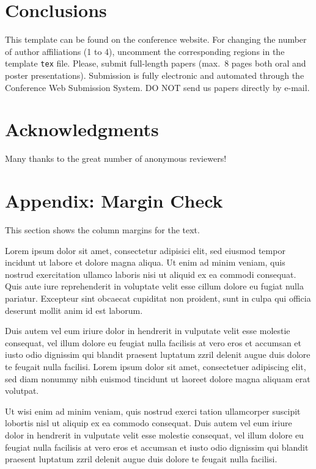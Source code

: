 \documentclass[twoside,a4paper]{article}
\begin{document}
\section{Conclusions}
This template can be found on the conference website.
For changing the number of author affiliations (1 to 4), uncomment the corresponding regions in the template \texttt{tex} file.
Please, submit full-length papers (max.~8 pages both oral and poster presentations).
Submission is fully electronic and automated through the Conference Web Submission System.
DO NOT send us papers directly by e-mail.

\section{Acknowledgments}
Many thanks to the great number of anonymous reviewers!

\nocite{*}


\section{Appendix: Margin Check}
This section shows the column margins for the text. \bigskip\newline

Lorem ipsum dolor sit amet, consectetur adipisici elit, sed eiusmod tempor incidunt ut labore et dolore magna aliqua. Ut enim ad minim veniam, quis nostrud exercitation ullamco laboris nisi ut aliquid ex ea commodi consequat. Quis aute iure reprehenderit in voluptate velit esse cillum dolore eu fugiat nulla pariatur. Excepteur sint obcaecat cupiditat non proident, sunt in culpa qui officia deserunt mollit anim id est laborum.


Duis autem vel eum iriure dolor in hendrerit in vulputate velit esse molestie consequat, vel illum dolore eu feugiat nulla facilisis at vero eros et accumsan et iusto odio dignissim qui blandit praesent luptatum zzril delenit augue duis dolore te feugait nulla facilisi. Lorem ipsum dolor sit amet, consectetuer adipiscing elit, sed diam nonummy nibh euismod tincidunt ut laoreet dolore magna aliquam erat volutpat.

Ut wisi enim ad minim veniam, quis nostrud exerci tation ullamcorper suscipit lobortis nisl ut aliquip ex ea commodo consequat. Duis autem vel eum iriure dolor in hendrerit in vulputate velit esse molestie consequat, vel illum dolore eu feugiat nulla facilisis at vero eros et accumsan et iusto odio dignissim qui blandit praesent luptatum zzril delenit augue duis dolore te feugait nulla facilisi.
\end{document}
